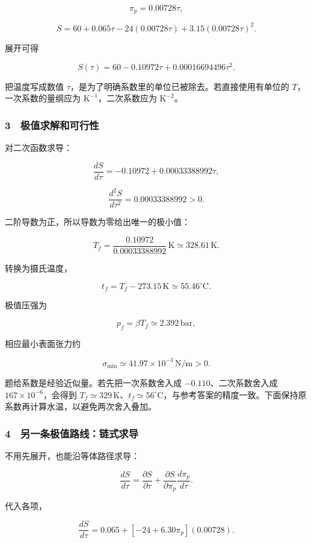 \documentclass[12pt,a4paper,fontset=fandol]{ctexart}
\begin{document}
\[\pi_p=0.00728\tau,\]

\[S=60+0.065\tau-24(0.00728\tau)
+3.15(0.00728\tau)^2.\]

展开可得

\[\boxed{S(\tau)=60-0.10972\tau
+0.00016694496\tau^2.}\]

把温度写成数值
\(\tau\)，是为了明确系数里的单位已被除去。若直接使用有单位的
\(T\)，一次系数的量纲应为 \(\mathrm{K^{-1}}\)，二次系数应为
\(\mathrm{K^{-2}}\)。

\subsubsection{3　极值求解和可行性}\label{ux6781ux503cux6c42ux89e3ux548cux53efux884cux6027}

对二次函数求导：

\[\frac{dS}{d\tau}=-0.10972+0.00033388992\tau,\]

\[\frac{d^2S}{d\tau^2}=0.00033388992>0.\]

二阶导数为正，所以导数为零给出唯一的极小值：

\[\boxed{T_f=
\frac{0.10972}{0.00033388992}\,\mathrm K
\simeq328.61\,\mathrm K.}\]

转换为摄氏温度，

\[\boxed{t_f=T_f-273.15\,\mathrm K
\simeq55.46^\circ\mathrm C.}\]

极值压强为

\[p_f=\beta T_f\simeq2.392\,\mathrm{bar},\]

相应最小表面张力约

\[\sigma_{\min}\simeq41.97\times10^{-3}\,\mathrm{N/m}>0.\]

题给系数是经验近似量。若先把一次系数舍入成 \(-0.110\)、二次系数舍入成
\(167\times10^{-6}\)，会得到
\(T_f\simeq329\,\mathrm K\)、\(t_f\simeq56^\circ\mathrm C\)，与参考答案的精度一致。下面保持原系数再计算水温，以避免两次舍入叠加。

\subsubsection{4　另一条极值路线：链式求导}\label{ux53e6ux4e00ux6761ux6781ux503cux8defux7ebfux94feux5f0fux6c42ux5bfc}

不用先展开，也能沿等体路径求导：

\[\frac{dS}{d\tau}
=\frac{\partial S}{\partial\tau}
+\frac{\partial S}{\partial\pi_p}
\frac{d\pi_p}{d\tau}.\]

代入各项，

\[\frac{dS}{d\tau}
=0.065+[-24+6.30\pi_p](0.00728).\]
\end{document}
